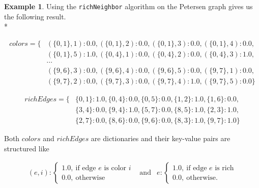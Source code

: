 \documentclass[12pt,a4paper]{amsart}
\theoremstyle{definition} %
\newtheorem{primer}[definicija]{Example}
\theoremstyle{plain} %
\begin{document}
            \begin{primer}
                Using the \texttt{richNeighbor} algorithm on the Petersen graph gives us the following result.\\*

                \begin{align*}
                    colors = \{ & (\{0, 1\}, 1): 0.0, (\{0, 1\}, 2): 0.0, (\{0, 1\}, 3): 0.0, (\{0, 1\}, 4): 0.0,\\
                                & (\{0, 1\}, 5): 1.0, (\{0, 4\}, 1): 0.0, (\{0, 4\}, 2): 0.0, (\{0, 4\}, 3): 1.0,\\
                                & \cdots \\
                                & (\{9, 6\}, 3): 0.0, (\{9, 6\}, 4): 0.0, (\{9, 6\}, 5): 0.0, (\{9, 7\}, 1): 0.0,\\
                                & (\{9, 7\}, 2): 0.0, (\{9, 7\}, 3): 0.0, (\{9, 7\}, 4): 1.0, (\{9, 7\}, 5): 0.0\}
                \end{align*}

                \begin{align*}
                    richEdges = \{& \{0, 1\}: 1.0, \{0, 4\}: 0.0, \{0, 5\}: 0.0, \{1, 2\}: 1.0, \{1, 6\}: 0.0,\\
                                  & \{3, 4\}: 0.0, \{9, 4\}: 1.0, \{5, 7\}: 0.0, \{8, 5\}: 1.0, \{2, 3\}: 1.0,\\
                                  & \{2, 7\}: 0.0, \{8, 6\}: 0.0, \{9, 6\}: 0.0, \{8, 3\}: 1.0, \{9, 7\}: 1.0\}
                \end{align*}

                \noindent Both $colors$ and $richEdges$ are dictionaries and their key-value pairs are structured like

                \begin{align*}
                    (e, i):
                    \begin{cases}
                        1.0, \  \text{if edge $e$ is color $i$} \\
                        0.0, \  \text{otherwise}
                    \end{cases} & \text{and} & 
                    e:
                    \begin{cases}
                        1.0, \  \text{if edge $e$ is rich} \\
                        0.0, \  \text{otherwise.}
                    \end{cases}
                \end{align*}

            \end{primer}    
\end{document}
